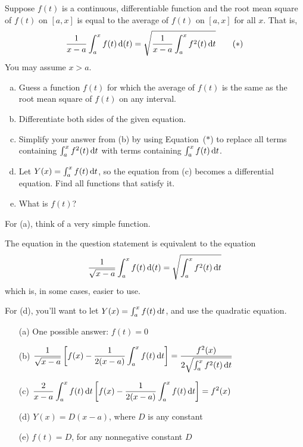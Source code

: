 \begin{question}
Suppose $f(t)$ is a continuous, differentiable function and the root mean square of $f(t)$ on $[a,x]$ is equal to the average of $f(t)$ on $[a,x]$ for all $x$. That is,
\begin{equation}
\frac{1}{x-a}\int_a^xf(t)\,\mathrm{d}(t)=\sqrt{\frac{1}{x-a}\int_a^x f^2(t)\,\mathrm{d}t}\tag{$*$}
\end{equation}
You may assume $x>a$.

\begin{enumerate}[(a)]
\item Guess a function $f(t)$ for which the average of $f(t)$ is the same as the root mean square of $f(t)$ on any interval.
\item Differentiate both sides of the given equation.
\item Simplify your answer from (b) by using Equation~($*$) to replace all terms containing $\int_a^x f^2(t)\,\mathrm{d}t$ with terms containing $\int_a^x f(t)\,\mathrm{d}t$.
\item Let $Y(x) = \int_a^x f(t)\,\mathrm{d}t$, so the equation from (c) becomes a differential equation. Find all functions that satisfy it.
\item What is $f(t)$?
\end{enumerate}
\end{question}
\begin{hint}
For (a), think of a very simple function.

The equation in the question statement is equivalent to the equation
\[\frac{1}{\sqrt{x-a}}\int_a^xf(t)\,\mathrm{d}(t)=\sqrt{\int_a^x f^2(t)\,\mathrm{d}t}\]
which is, in some cases, easier to use.

For (d), you'll want to let $Y(x)=\int_a^x f(t)\,\mathrm{d}t$, and use the quadratic equation. \end{hint}
\begin{answer}
\begin{enumerate}
\item[(a)] One possible answer: $f(t)=0$
\item[(b)] $\displaystyle \frac{1}{\sqrt{x-a}}\left[f(x) - \frac{1}{2(x-a)}\int_a^x f(t)\,\mathrm{d}t\right]
=\frac{f^2(x)}{2\sqrt{\int_a^xf^2(t)\,\mathrm{d}t}}$
\item[(c)] $\displaystyle \frac{2}{x-a}\int_a^x f(t)\,\mathrm{d}t\left[f(x) - \frac{1}{2(x-a)}\int_a^x f(t)\,\mathrm{d}t\right]=f^2(x)$
\item[(d)] $Y(x) = D(x-a)$, where $D$ is any constant
\item[(e)] $f(t)=D$, for any nonnegative constant $D$
\end{enumerate}
\end{answer}
